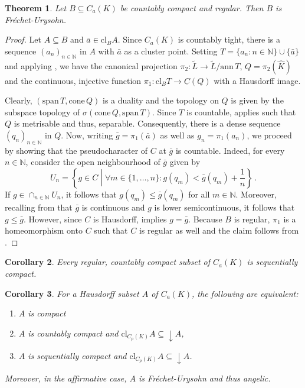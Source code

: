 \documentclass[
	paper=A4,
	pagesize=auto,
	fontsize=12pt
]{scrartcl}
\theoremstyle{plain}
\newtheorem{theorem}{Theorem}[section]
\newtheorem{corollary}[theorem]{Corollary}
\theoremstyle{remark}
\theoremstyle{definition}
\begin{document}
%
\begin{theorem}
Let $B \subseteq C_a(K)$ be countably compact and regular.
Then $B$ is Fréchet-Urysohn.
\end{theorem}
\begin{proof}
Let $A \subseteq B$ and $\bar{a} \in \mathrm{cl}_B A$.
Since $C_a(K)$ is countably tight, there is a sequence $(a_n)_{n \in \mathbb{N}}$ in $A$ with $\bar{a}$ as a cluster point.
Setting $T = \{ a_n : n \in \mathbb{N} \} \cup \{ \bar{a} \}$ and applying , we have the canonical projection $\pi_2 : \widetilde{L} \to \widetilde{L} / \mathrm{ann}\, T$, $Q = \pi_2(\widehat{K})$ and the continuous, injective function $\pi_1 : \mathrm{cl}_B T \to \underline{C}(Q)$ with a Hausdorff image.

Clearly, $(\mathrm{span}\, T, \mathrm{cone}\, Q)$ is a duality and the topology on $Q$ is given by the subspace topology of $\sigma( \mathrm{cone}\, Q, \mathrm{span}\, T)$.
Since $T$ is countable,  applies such that $Q$ is metrisable and thus, separable.
Consequently, there is a dense sequence $(q_n)_{n \in \mathbb{N}}$ in $Q$.
Now, writing $\bar{g} = \pi_1(\bar{a})$ as well as $g_n = \pi_1(a_n)$, we proceed by showing that the pseudocharacter of $C$ at $\bar{g}$ is countable.
Indeed, for every $n \in \mathbb{N}$, consider the open neighbourhood of $\bar{g}$ given by
%
\begin{equation}
U_n = \left\{ g \in C \middle| \forall m \in \{ 1, \dots, n \} : g \left( q_m \right) < \bar{g} \left( q_m \right) + \frac{1}{n} \right\} \, .
\end{equation}
%
If $g \in \cap_{n \in \mathbb{N}} U_n$, it follows that $g(q_m) \le \bar{g}(q_m)$ for all $m \in \mathbb{N}$.
Moreover, recalling from  that $\bar{g}$ is continuous and $g$ is lower semicontinuous, it follows that $g \le \bar{g}$.
However, since $C$ is Hausdorff,  implies $g = \bar{g}$.
Because $B$ is regular, $\pi_1$ is a homeomorphism onto $C$ such that $C$ is regular as well and the claim follows from .
\end{proof}
%
\begin{corollary}
\label{cor:RegularCountablyCompactImpliesSequentiallyCompact}
Every regular, countably compact subset of $C_a(K)$ is sequentially compact.
\end{corollary}
%
\begin{corollary}
For a Hausdorff subset $A$ of $C_a(K)$, the following are equivalent:
%
\begin{enumerate}
\item $A$ is compact
\item $A$ is countably compact and $\mathrm{cl}_{C_p(K)} A \subseteq \downarrow A$,
\item $A$ is sequentially compact and $\mathrm{cl}_{C_p(K)} A \subseteq \downarrow A$.
\end{enumerate}
%
Moreover, in the affirmative case, $A$ is Fréchet-Urysohn and thus angelic.
\end{corollary}
\end{document}

